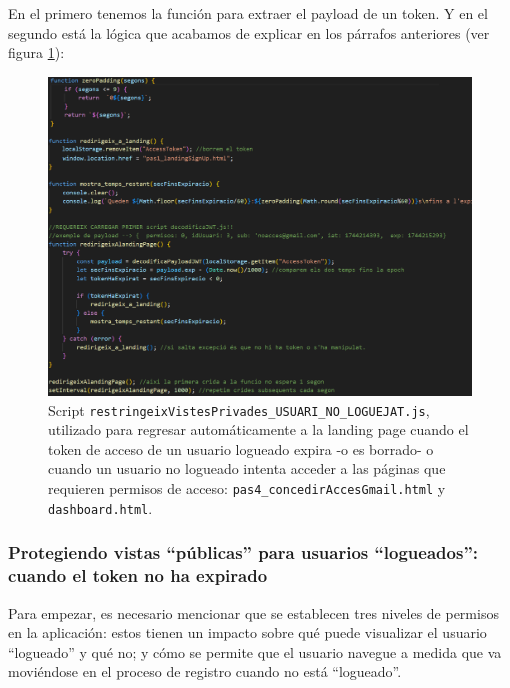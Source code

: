 \documentclass[a4paper,12pt]{report}
\begin{document}
	En el primero tenemos la función para extraer el payload de un token. Y en el segundo está la lógica que acabamos de explicar en los párrafos anteriores (ver figura \ref{fig:restringeixVistesPrivades_USUARI_NO_LOGUEJAT}):
	
	
	\setlength{\belowcaptionskip}{3pt}
	\FloatBarrier
	\begin{figure}[H]
		\centering
		\caption{Script \texttt{restringeixVistesPrivades\_USUARI\_NO\_LOGUEJAT.js}, utilizado para regresar automáticamente a la landing page cuando el token de acceso de un usuario logueado expira -o es borrado- o cuando un usuario no logueado intenta acceder a las páginas que requieren permisos de acceso: \texttt{pas4\_concedirAccesGmail.html} y \texttt{dashboard.html}.}
		\includegraphics[width=1\linewidth]{img/restringeixVistesPrivades_USUARI_NO_LOGUEJAT.png}

		\label{fig:restringeixVistesPrivades_USUARI_NO_LOGUEJAT}
	\end{figure}
	\FloatBarrier
	
	\subsubsection{Protegiendo vistas ``públicas'' para usuarios ``logueados'': cuando el token no ha expirado}
	\label{sec:vistasPermisos}
	

	
	Para empezar, es necesario mencionar que se establecen tres niveles de permisos en la aplicación: estos  tienen un impacto sobre qué puede visualizar el usuario ``logueado'' y qué no; y cómo se permite que el usuario navegue a medida que va moviéndose en el proceso de registro cuando no está ``logueado''.
	
\end{document}
